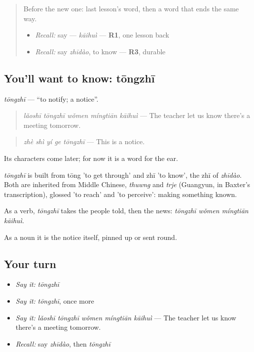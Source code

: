 \label{lesson:ZH-C157-tongzhi}



\begin{quote}
Before the new one: last lesson's word, then a word that ends the same way.

\begin{itemize}
\raggedright
  \item \emph{Recall:} say  — \emph{kāihuì} — \textbf{R1}, one lesson back
  \item \emph{Recall:} say \emph{zhīdào}, to know — \textbf{R3}, durable
\end{itemize}
\end{quote}

\subsection*{You'll want to know: tōngzhī}
\emph{tōngzhī} — \textquotedblleft{}to notify; a notice\textquotedblright{}.

\begin{quote}
\emph{lǎoshī tōngzhī wǒmen míngtiān kāihuì} — The teacher let us know there's a meeting tomorrow.
\end{quote}

\begin{quote}
\emph{zhè shì yí ge tōngzhī} — This is a notice.
\end{quote}

Its characters come later; for now it is a word for the ear.

\begin{cousinweb}
\emph{tōngzhī} is built from tōng 'to get through' and zhī 'to know', the zhī of \emph{zhīdào}. Both are inherited from Middle Chinese, \emph{thuwng} and \emph{trje} (Guangyun, in Baxter's transcription), glossed 'to reach' and 'to perceive': making something known.
\end{cousinweb}

\begin{grammarlens}[title={What you've built}]
As a verb, \emph{tōngzhī} takes the people told, then the news: \emph{tōngzhī wǒmen míngtiān kāihuì}.

As a noun it is the notice itself, pinned up or sent round.
\end{grammarlens}

\subsection*{Your turn}
\begin{itemize}
\raggedright
  \item \emph{Say it:} \emph{tōngzhī}
  \item \emph{Say it:} \emph{tōngzhī}, once more
  \item \emph{Say it:} \emph{lǎoshī tōngzhī wǒmen míngtiān kāihuì} — The teacher let us know there's a meeting tomorrow.
  \item \emph{Recall:} say \emph{zhīdào}, then \emph{tōngzhī}
\end{itemize}


